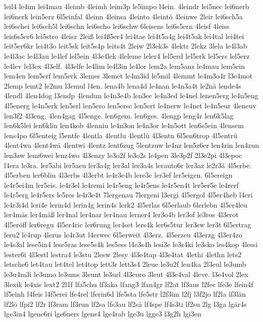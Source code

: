 {leil4
le4im
lei4mau
4leimb
4leimh
leim3p
le5impo
l4ein.
4leindr
lei5nec
lei6nerb
lei6nerk
lein5erz
6l5einfal
4leinn
4leinsa
4leinto
4leintö
4leinwe
2leir
lei6sch5a
lei6schei
lei6sch5l
lei6schn
lei6scho
lei6schw
6leisens
lei6s5ern
4leisf
4leiss
leis6s5er6
lei5stro
4leisz
2leiß
lei4ß5er4
lei4tae
lei4t5a4g
lei4t5ak
lei4tal
lei4tei
leit5er6kr
lei4t3o
leit5sk
leit5s4p
leits4t
2leiw
2l3ek3s
4lektr
2lekz
3lela
le4l3ab
le4l3ac
le4l3au
le4lef
lel5ein
4l3e4lek
4leleme
leler4
lel5erd
lel5erk
lel5ers
lel5erz
le4lev
lel3ex
4l3elf.
4l3elfe
le4lim
le4l3in
le4lor
lem2a
lem5anz
le4mau
lem5ein
lem4en
lem5erf
lem5erk
3lemes
3lemet
le4m3id
le5mil
4lemmt
le4m3o4r
l3e4mot
2lemp
lemt2
le2mu
l3emul
l4en.
lena4b
lena4d
le4nan
le4n3a4t
le2nä
lende4s
4lendl
4len4dog
l3endp
4lendun
le4n3e4b
len3ec
le4n3ed
le4nel
lenen5erg
le4n5eng
4l5energ
le4n5erk
len5erl
len5ero
len5ersc
len5ert
le4nerw
le4net
le4n5eur
4leneuv
len3f2
4l3eng.
4len4gag
4l5enge.
len6gem.
len6ges.
4lengp
leng4r
len6k5lag
len6k5lei
len6klin
len4kob
4lenniu
le4n3on
le4n3or
le4n5ott
len6s5ein
4lensem
lens4po
6l5enteig
l5entfe
4lentla
4lentlu
4lentlü
4l3entn
6l5en6trop
4l5entrü
4lent4wa
4lent4wä
4lentwi
4lentz
lent6zug
5lentzuw
le4nz
len5z6er
len4zin
len4zun
len3zw
lenz6wei
lenz4wo
4l3enzy
le3o2f
le3o2s
le4pen
3le3p2f
2l3e2pi
4l3epoc
l4era
le3ra.
ler5abi
ler5aeu
ler3a4g
ler3al
ler3a4s
lerauto6r
ler3az
le2r3ä
4l5erbe.
4l5erben
ler6blin
4l3erbs
4l3erbt
le4r3e4b
lere3c
ler3ef
ler5eigen.
6l5ereign
le4r5ei4m
ler5eis.
le4r3el
le4remi
le4r5eng
le4r5ens
le4r5en4t
ler5er5e
le4rerf
le4r5erg
le4r5ers
le5res
le4r3e4t
7lergenau
7lergeni
l3ergi
4l5ergol
4l5er4heb
l4eri
le4r3i4d
leri4e
lerin4d
lerin4g
lerin4s
lerk2
4l5erlas
6l5erlaub
6lerlebn
4l5er4leu
ler4mäs
ler4mäß
ler4nal
ler4nar
ler4nau
lerner4
ler3o4b
ler3of
le3ros
4l3erot
4l5eröff
ler6regu
4l5er4ric
ler6rung
ler4set
lers4k
ler6s5tur
ler3sw
ler3t
6l5ertrag
leru2
le4rup
4lerus
le4r3ut
l4erwec
6l5erweit
4l3erz.
4l5erzeu
4l3erzg
4l3er4zo
le4s3al
lese5in4
lese5ras
lese5s4k
les5ess
l4e3s4h
lesi3e
le3s4ki
le3sko
les4kop
4lessi
lester6i
4l3estl
lestra4
le3stu
2lesw
2lesy
4l3e4tap
4l3e4tat
4lethi
4lethn
lets2
letsche6
let4tau
let4tel
let4top
lett3r
lett3s4
2leue
le3u2f
leu4ka
2l3eul
le3umb
le3u4m3i
le3umo
le3ums
3leunt
le3url
4l3euro
3leut
4l3e4val
4leve.
l3e4vol
2lex
3lexik
le4xis
lext2
2l1f
lfa5chu
lf3aka
lfang3
lfan4gr
lf2at
lf3aus
l2fec
lfe3e
lfein4f
lf5einh
l4feis
l4f5erei
lfe4rel
lferin6d
lfe5sta
lfe5str
l2f3im
l2fj
l3f2jo
lf2la
lf3län
lf2lö
lfpi2
lf2r
lf3ram
lf3run
lf2sa
lfs3au
lf2sä
lf4spe
lf4s3ti
lf2su
2lg
l3ga
lgär4s
lge3in4
lgene6ri
lge6ners
lgens4
lge4rab
lge3u
lgge3
l3g2h
lgi3en
}

